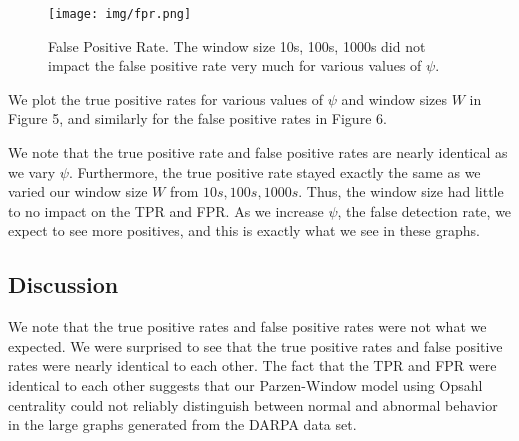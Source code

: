 \documentclass[10pt,twocolumn]{article}
\begin{document}
\noindent
\begin{figure}
  \label{fpr}
  \centering
    \texttt{[image: img/fpr.png]}
    \caption{False Positive Rate. The window size 10s, 100s, 1000s did not impact the false positive rate very
    much for various values of $\psi$.} 
\end{figure}

We plot the true positive rates for various values of $\psi$ and window sizes $W$ in Figure 5, and similarly for the false positive rates in Figure 6.

We note that the true positive rate and false positive rates are nearly identical as we vary $\psi$. Furthermore, the true positive rate stayed exactly the same as we varied our window size $W$ from $10s, 100s, 1000s$. Thus, the window size had little to no impact on the TPR and FPR. As we increase $\psi$, the false detection rate, we expect to see more positives, and this is exactly what we see in these graphs.

\subsection{Discussion}

We note that the true positive rates and false positive rates were not what we expected. We were surprised to see that the true positive rates and false positive rates were nearly identical to each other. The fact that the TPR and FPR were identical to each other suggests that our Parzen-Window model using Opsahl centrality could not reliably distinguish between normal and abnormal behavior in the large graphs generated from the DARPA data set. 
\end{document}
